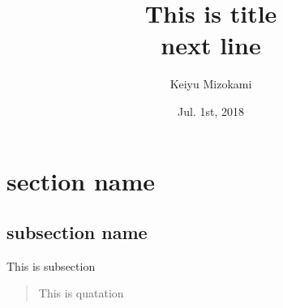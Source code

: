 \documentclass{article}
\begin{document}
\title{This is title \\ next line}
\author{Keiyu Mizokami}

\date{Jul. 1st, 2018}
\maketitle %


\section{section name}

\subsection{subsection name}
This is subsection

\begin{quotation}
This is quatation
\end{quotation}
\end{document}
